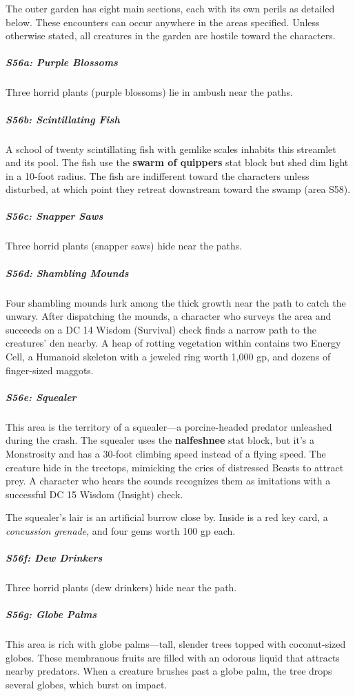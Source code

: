 \documentclass[10pt,a4paper,twoside,bg=print,twocolumn,openany,nodeprecatedcode]{dndbook}
\begin{document}
The outer garden has eight main sections, each with its own perils as detailed below. These encounters can occur anywhere in the areas specified. Unless otherwise stated, all creatures in the garden are hostile toward the characters.

\subparagraph{S56a: Purple Blossoms}
Three horrid plants (purple blossoms) lie in ambush near the paths.

\subparagraph{S56b: Scintillating Fish}
A school of twenty scintillating fish with gemlike scales inhabits this streamlet and its pool. The fish use the \textbf{swarm of quippers} stat block but shed dim light in a 10-foot radius. The fish are indifferent toward the characters unless disturbed, at which point they retreat downstream toward the swamp (area S58).

\subparagraph{S56c: Snapper Saws}
Three horrid plants (snapper saws) hide near the paths.

\subparagraph{S56d: Shambling Mounds}
Four shambling mounds lurk among the thick growth near the path to catch the unwary. After dispatching the mounds, a character who surveys the area and succeeds on a DC 14 Wisdom (Survival) check finds a narrow path to the creatures' den nearby. A heap of rotting vegetation within contains two Energy Cell, a Humanoid skeleton with a jeweled ring worth 1,000 gp, and dozens of finger-sized maggots.

\subparagraph{S56e: Squealer}
This area is the territory of a squealer—a porcine-headed predator unleashed during the crash. The squealer uses the \textbf{nalfeshnee} stat block, but it's a Monstrosity and has a 30-foot climbing speed instead of a flying speed. The creature hide in the treetops, mimicking the cries of distressed Beasts to attract prey. A character who hears the sounds recognizes them as imitations with a successful DC 15 Wisdom (Insight) check.

The squealer's lair is an artificial burrow close by. Inside is a red key card, a \textit{concussion grenade}, and four gems worth 100 gp each.

\subparagraph{S56f: Dew Drinkers}
Three horrid plants (dew drinkers) hide near the path.

\subparagraph{S56g: Globe Palms}
This area is rich with globe palms—tall, slender trees topped with coconut-sized globes. These membranous fruits are filled with an odorous liquid that attracts nearby predators. When a creature brushes past a globe palm, the tree drops several globes, which burst on impact.
\end{document}
